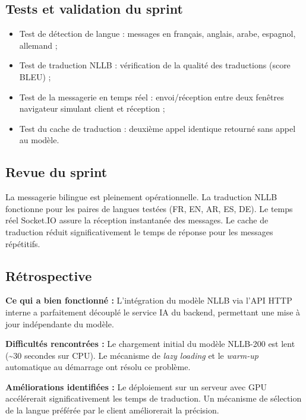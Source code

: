 \subsection{Tests et validation du sprint}

\begin{itemize}
  \item Test de détection de langue : messages en français, anglais, arabe, espagnol, allemand ;
  \item Test de traduction NLLB : vérification de la qualité des traductions (score BLEU) ;
  \item Test de la messagerie en temps réel : envoi/réception entre deux fenêtres navigateur simulant client et réception ;
  \item Test du cache de traduction : deuxième appel identique retourné sans appel au modèle.
\end{itemize}

\subsection{Revue du sprint}

La messagerie bilingue est pleinement opérationnelle. La traduction NLLB fonctionne pour les paires de langues testées (FR, EN, AR, ES, DE). Le temps réel Socket.IO assure la réception instantanée des messages. Le cache de traduction réduit significativement le temps de réponse pour les messages répétitifs.

\subsection{Rétrospective}

\textbf{Ce qui a bien fonctionné :} L'intégration du modèle NLLB via l'API HTTP interne a parfaitement découplé le service IA du backend, permettant une mise à jour indépendante du modèle.

\textbf{Difficultés rencontrées :} Le chargement initial du modèle NLLB-200 est lent (\textasciitilde{}30 secondes sur CPU). Le mécanisme de \textit{lazy loading} et le \textit{warm-up} automatique au démarrage ont résolu ce problème.

\textbf{Améliorations identifiées :} Le déploiement sur un serveur avec GPU accélérerait significativement les temps de traduction. Un mécanisme de sélection de la langue préférée par le client améliorerait la précision.

